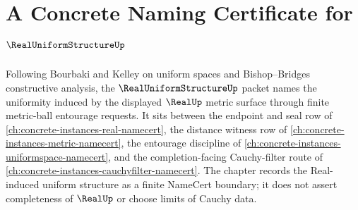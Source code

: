 \chapter{A Concrete Naming Certificate for $\RealUniformStructureUp$}
\label{ch:concrete-instances-real-uniform-structure-namecert}

Following Bourbaki and Kelley on uniform spaces and Bishop--Bridges constructive analysis, the $\RealUniformStructureUp$ packet names the uniformity induced by the displayed $\RealUp$ metric surface through finite metric-ball entourage requests. It sits between the endpoint and seal row of \autoref{ch:concrete-instances-real-namecert}, the distance witness row of \autoref{ch:concrete-instances-metric-namecert}, the entourage discipline of \autoref{ch:concrete-instances-uniformspace-namecert}, and the completion-facing Cauchy-filter route of \autoref{ch:concrete-instances-cauchyfilter-namecert}. The chapter records the Real-induced uniform structure as a finite NameCert boundary; it does not assert completeness of $\RealUp$ or choose limits of Cauchy data.


